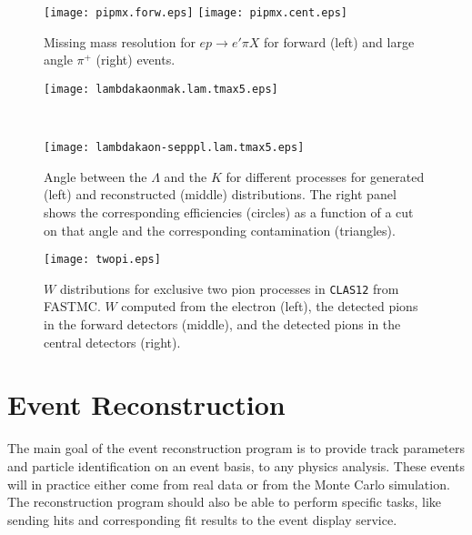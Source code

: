 \begin{figure}[htb]
\texttt{[image: pipmx.forw.eps]}
\texttt{[image: pipmx.cent.eps]}
\caption{\small{Missing mass resolution for $ep \to e'\pi X$ for forward  
(left) and large angle $\pi^+$ (right) events.}}
\label{fig:epX}
\end{figure}

\begin{figure}[htb]
\begin{minipage}[b]{6.0cm}
\texttt{[image: lambdakaonmak.lam.tmax5.eps]}
\end{minipage}
    \ \hspace{0mm} \hspace{0mm} \
\begin{minipage}[b]{6.0cm}
\texttt{[image: lambdakaon-sepppl.lam.tmax5.eps]}
\end{minipage}
\caption{\small{Angle between the $\Lambda$ and the $K$ for different 
processes for generated (left) and reconstructed (middle) distributions. 
The right panel shows the corresponding efficiencies (circles) as a 
function of a cut on that angle and the corresponding contamination 
(triangles).}}
\label{fig:KLam}
\end{figure}

\begin{figure}[htb]
\texttt{[image: twopi.eps]}
\caption{\small{$W$ distributions for exclusive two pion processes in 
{\tt CLAS12} from FASTMC. $W$ computed from the electron (left), the
detected pions in the forward detectors (middle), and the detected pions 
in the central detectors (right).}}
\label{fig:twopi}
\end{figure}

\section{Event Reconstruction}

The main goal of the event reconstruction program is to provide track 
parameters and particle identification on an event basis, to any physics 
analysis. These events will in practice either come from real data or 
from the Monte Carlo simulation.  The reconstruction program should also 
be able to perform specific tasks, like sending hits and corresponding fit 
results to the event display service. 

